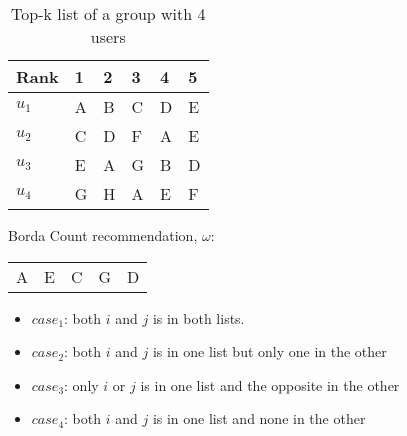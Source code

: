 \begin{frame}[t]
\begin{columns}
\begin{column}{0.5\textwidth}
\footnotesize
\vspace{-0.3cm}
\begin{table}
\captionsetup{font=footnotesize}
\begin{tabular}{|l|lllll|} \hline
Rank  & 1 & 2 & 3 & 4 & 5 \\\hline
$u_1$ & A & B & C & D & E \\
$u_2$ & C & D & F & A & E \\
$u_3$ & E & A & G & B & D \\
$u_4$ & G & H & A & E & F\\\hline
\end{tabular}
\caption{Top-k list of a group with 4 users}
\end{table}
Borda Count recommendation, $\omega$: \\
\begin{table}
\centering
\begin{tabular}{lllll}
 A & E & C & G & D
\end{tabular}
\end{table}

\normalsize
\begin{itemize}
\item $case_1$: both $i$ and $j$ is in both lists.
\item $case_2$: both $i$ and $j$ is in one list but only one in the other
\item $case_3$: only $i$ or $j$ is in one list and the opposite in the other
\item $case_4$: both $i$ and $j$ is in one list and none in the other
\end{itemize}

\end{column}
\end{columns}
\end{frame}